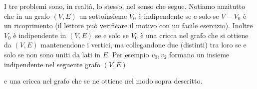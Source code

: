 \begin{enumerate}
\begin{enumerate}
          \end{enumerate}

          I tre problemi sono, in realtà, lo stesso, nel senso che segue.
          Notiamo anzitutto che in un grafo $(V, E)$ un sottoinsieme $V_0$ è
          indipendente se e solo se $V-V_0$ è un ricoprimento (il lettore può
          verificare il motivo con un facile esercizio). Inoltre $V_0$ è
          indipendente in $(V, E)$ se e solo se $V_0$ è una cricca nel grafo che
          si ottiene da $(V, E)$ mantenendone i vertici, ma collegandone due
          (distinti) tra loro se e solo se non sono uniti da lati in $E$. Per
          esempio $v_0, v_2$ formano un insieme indipendente nel seguente grafo
          $(V, E)$
          \begin{center}
          \end{center}

          e una cricca nel grafo che se ne ottiene nel modo sopra descritto.
          \begin{center}
\end{center}
\end{enumerate}
